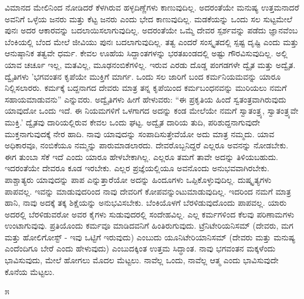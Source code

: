 ವಿಮಾನದ ಮೇಲಿನಿಂದ ನೋಡಿದರೆ ಕೆಳಗಿರುವ ಹಳ್ಳದಿಣ್ಣೆಗಳು ಕಾಣುವುದಿಲ್ಲ. ಅದರಂತೆಯೇ ಮನುಷ್ಯ ಉತ್ತಮನಾದರೆ ಅವನಿಗೆ ಒಳ್ಳೆಯ ಜನರು ಮತ್ತು ಕೆಟ್ಟ ಜನರು ಎಂದು ಭೇದ ಕಾಣುವುದಿಲ್ಲ. ಮಡಕೆಯನ್ನು ಒಂದು ಸಲ ಸುಟ್ಟಮೇಲೆ ಪುನಃ ಅದರ ಆಕಾರವನ್ನು ಬದಲಾಯಿಸಲಾಗುವುದಿಲ್ಲ. ಅದರಂತೆಯೇ ಒಮ್ಮೆ ದೇವರ ಸ್ಪರ್ಶವನ್ನು ಪಡೆದು ಜ್ಞಾನವೆಂಬ ಬೆಂಕಿಯಲ್ಲಿ ಬೆಂದ ಮೇಲೆ ಜೀವಿಯು ಪುನಃ ಬದಲಾಗುವುದಿಲ್ಲ. ತತ್ವ ಎಂದರೆ ಸಂಸ್ಕೃತದಲ್ಲಿ ಸ್ಪಷ್ಟ ದೃಷ್ಟಿ ಎಂದು ಮತ್ತು ಆನುಷ್ಠಾನಿಕ ತತ್ವವೇ ಧರ್ಮ. ಕೇವಲ ಊಹೆಯ ಸಿದ್ದಾಂತಗಳನ್ನು ಭರತಖಂಡದಲ್ಲಿ ಅಷ್ಟು ಗೌರವಿಸುವುದಿಲ್ಲ. ಅಲ್ಲಿ ಯಾವ ಚರ್ಚೂ ಇಲ್ಲ, ಮತವಿಲ್ಲ, ಮೂಢನಂಬಿಕೆಗಳಿಲ್ಲ. ಇರುವ ಎರಡು ದೊಡ್ಡ ಪಂಗಡಗಳೇ ದ್ವೈತ ಮತ್ತು ಅದ್ವೈತ. ದ್ವೈತಿಗಳು 'ಭಗವಂತನ ಕೃಪೆಯೇ ಮುಕ್ತಿಗೆ ಮಾರ್ಗ. ಒಂದು ಸಲ ಜಾರಿಗೆ ಬಂದ ಕರ್ಮನಿಯಮವನ್ನು ಯಾರೂ ನಿಲ್ಲಿಸಲಾರರು. ಕರ್ಮಕ್ಕೆ ಬದ್ದನಾಗದ ದೇವರು ಮಾತ್ರ ತನ್ನ ಕೃಪೆಯಿಂದ ಕರ್ಮಬಂಧನವನ್ನು ಮುರಿಯಲು ನಮಗೆ ಸಹಾಯಮಾಡುವನು” ಎನ್ನುವರು. ಅದ್ವೈತಿಗಳು ಹೀಗೆ ಹೇಳುವರು: “ಈ ಪ್ರಕೃತಿಯ ಹಿಂದೆ ಸ್ವತಂತ್ರವಾಗಿರುವುದು ಯಾವುದೋ ಒಂದು ಇದೆ. ಈ ನಿಯಮಗಳಿಗೆ ಒಳಗಾಗದ ಅದನ್ನು ಕಂಡ ಮೇಲೆಯೇ ನಮಗೆ ಸ್ವಾತಂತ್ರ್ಯ, ಸ್ವಾತಂತ್ರ್ಯವೇ ಮುಕ್ತಿ.' ದ್ವೈತವು ದಾರಿಯಲ್ಲಿರುವ ಕೇವಲ ಒಂದು ಘಟ್ಟ. ಅದ್ವೈತ ದಾರಿಯ ತುದಿ, ಪರಿಶುದ್ದನಾಗುವುದೇ ಮುಕ್ತನಾಗುವುದಕ್ಕೆ ನೇರ ಹಾದಿ. ನಾವು ಯಾವುದನ್ನು ಸಂಪಾದಿಸುತ್ತೇವೆಯೋ ಅದು ಮಾತ್ರ ನಮ್ಮದು. ಯಾವ ಅಧಿಕಾರವೂ, ನಂಬಿಕೆಯೂ ನಮ್ಮನ್ನು ಪಾರುಮಾಡಲಾರದು. ದೇವರೊಬ್ಬನಿದ್ದರೆ ಎಲ್ಲರೂ ಅವನನ್ನು ನೋಡಬೇಕು. ಈಗ ತುಂಬಾ ಸೆಕೆ ಇದೆ ಎಂದು ಯಾರೂ ಹೇಳಬೇಕಾಗಿಲ್ಲ. ಎಲ್ಲರೂ ತಮಗೆ ತಾವೇ ಅದನ್ನು ತಿಳಿಯಬಹುದು. ಇದರಂತೆಯೇ ದೇವರೂ ಕೂಡ ಇರಬೇಕು. ಎಲ್ಲರ ಪ್ರಜ್ಞೆಯಲ್ಲಿಯೂ ಅವನೊಂದು ಅನುಭವವಾಗಿರಬೇಕು. ಪಾಶ್ಚಾತ್ಯರು ಯಾವುದನ್ನು ಪಾಪ ಎನ್ನುತ್ತಾರೆಯೋ ಅದನ್ನು ಹಿಂದೂಗಳು ಒಪ್ಪಿಕೊಳ್ಳುವುದಿಲ್ಲ. ದುಷ್ಕೃತ್ಯಗಳು ಪಾಪವಲ್ಲ. ಇವನ್ನು ಮಾಡುವುದರಿಂದ ನಾವು ದೇವರಿಗೆ ಕೋಪವನ್ನುಂಟುಮಾಡುವುದಿಲ್ಲ. ಇದರಿಂದ ನಮಗೆ ಮಾತ್ರ ಹಾನಿ, ನಾವು ಅದಕ್ಕೆ ತಕ್ಕ ಶಿಕ್ಷೆಯನ್ನು ಅನುಭವಿಸಬೇಕು. ಬೆಂಕಿಯೊಳಗೆ ಬೆರಳಿಡುವುದೊಂದು ಪಾಪವಲ್ಲ. ಯಾರು ಅದರಲ್ಲಿ ಬೆರಳಿಡುವರೋ ಅವರ ಕೈಗಳು ಸುಡುವುದರಲ್ಲಿ ಸಂದೇಹವಿಲ್ಲ. ಎಲ್ಲ ಕರ್ಮಗಳಿಂದ ಕೆಲವು ಪರಿಣಾಮಗಳು ಉಂಟಾಗುವುವು. ಪ್ರತಿಯೊಂದು ಕರ್ಮವೂ ಮಾಡಿದವನಿಗೆ ಹಿಂತಿರುಗುವುದು. ಟ್ರೆನಿಟೇರಿಯನಿಸಮ್ (ದೇವರು, ಮಗ ಮತ್ತು ಹೋಲಿಗೋಸ್ಟ್ - ಇವು ಒಟ್ಟಿಗೆ ಇರುವುದು) ಎಂಬುದು ಯೂನಿಟೇರಿಯಾನಿಸಮ್ (ದೇವರು ಮತ್ತು ಮನುಷ್ಯ ಎಂದೆಂದಿಗೂ ಬೇರೆ ಎಂದು ಹೇಳುವುದು) ಎಂಬುದಕ್ಕಿಂತ ಉತ್ತಮ ಸಿದ್ಧಾಂತ. ನಾವು ಭಗವಂತನ ಮಕ್ಕಳೆಂದು ಭಾವಿಸುವುದು, ಮೇಲೆ ಹೋಗಲು ಮೊದಲ ಮೆಟ್ಟಲು. ನಾವೆಲ್ಲ ಒಂದು, ನಾವೆಲ್ಲ ಆತ್ಮ ಎಂದು ಭಾವಿಸುವುದೇ ಕೊನೆಯ ಮೆಟ್ಟಲು.

\begin{center}
೫
\end{center}

